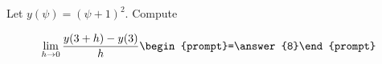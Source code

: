 \documentclass{ximera}
\author{Bart Snapp}
\begin{document}
\begin{exercise}
Let $y(\psi) = (\psi +1)^2$. Compute

\[
\lim_{ h\to 0 } \frac{y(3+h)-y(3)}{h} \begin{prompt}=\answer{8}\end{prompt}
\]
\end{exercise}
\end{document}
